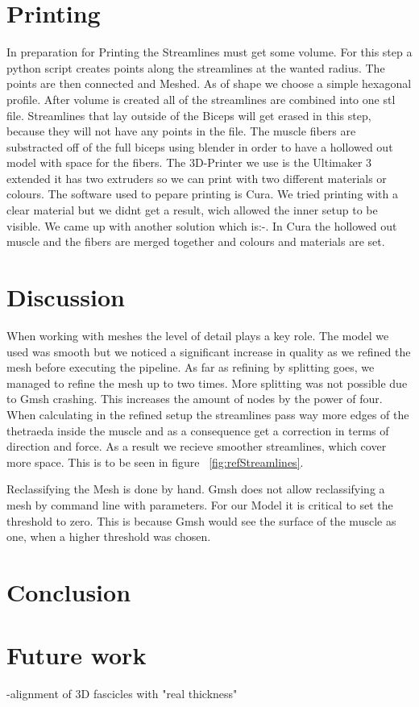 \documentclass[preprint,journal]{vgtc}       %
\begin{document}
\section{Printing}
In preparation for Printing the Streamlines must get some volume. For this step a python script creates points along the streamlines at the wanted radius. The points are then connected and Meshed. As of shape we choose a simple hexagonal profile. After volume is created all of the streamlines are combined into one stl file. Streamlines that lay outside of the Biceps will get erased in this step, because they will not have any points in the file. The muscle fibers are substracted off of the full biceps using blender in order to have a hollowed out model with space for the fibers. 
The 3D-Printer we use is the Ultimaker 3 extended it has two extruders so we can print with two different materials or colours. The software used to pepare printing is Cura. We tried printing with a clear material but we didnt get a result, wich allowed the inner setup to be visible. We came up with another solution which is:-.
In Cura the hollowed out muscle and the fibers are merged together and colours and materials are set.

\section{Discussion}
When working with meshes the level of detail plays a key role. The model we used was smooth but we noticed a significant increase in quality as we refined the mesh before executing the pipeline. As far as refining by splitting goes, we managed to refine the mesh up to two times. More splitting was not possible due to Gmsh crashing. This increases the amount of nodes by the power of four. When calculating in the refined setup the streamlines pass way more edges of the thetraeda inside the muscle and as a consequence get a correction in terms of direction and force. As a result we recieve smoother streamlines, which cover more space. This is to be seen in figure ~\ref{fig:refStreamlines}.

Reclassifying the Mesh is done by hand. Gmsh does not allow reclassifying a mesh by command line with parameters. For our Model it is critical to set the threshold to zero. This is because Gmsh would see the surface of the muscle as one, when a higher threshold was chosen.

\section{Conclusion}


\section{Future work}
-alignment of 3D fascicles with "real thickness"



\end{document}

